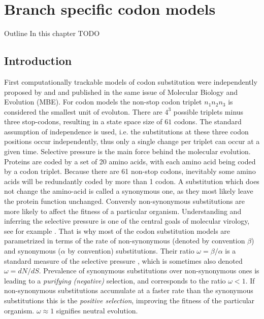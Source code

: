 \chapter{Branch specific codon models\label{chap:dpp}}

\begin{remark}{Outline}
In this chapter
TODO
\end{remark}

\section{Introduction}

First computationally trackable models of codon substitution were independently proposed by \cite{Muse1994} and \cite{Goldman1994} and published in the same issue of Molecular Biology and Evolution (MBE).
For codon models the non-stop codon triplet $n_{1}n_{2}n_{3}$ is considered the smallest unit of evoluton.
There are $4^3$ possible triplets minus three stop-codons, resulting in a state space size of $61$ codons.
The standard assumption of independence is used, i.e. the substitutions at these three codon positions occur independently, thus only a single change per triplet can occur at a given time.
Selective pressure is the main force behind the molecular evolution.
Proteins are coded by a set of 20 amino acids, with each amino acid being coded by a codon triplet. 
Because there are 61 non-stop codons, inevitably some amino acids will be redundantly coded by more than 1 codon.
A substitution which does not change the amino-acid is called a synonymous 
one,
as they most likely leave the protein function unchanged.
Conversly non-synonymous substitutions are more likely to affect the fitness of a particular organism.
Understanding and inferring the selective pressure is one of the central goals of molecular virology, see for example \citet{Bielejec2014a}.
That is why most of the codon substitution models are parametrized in terms of the rate of non-synonymous (denoted by convention $\beta$) and synonymous ($\alpha$ by convention) substitutions.
Their ratio $\omega=\beta / \alpha$ is a standard measure of the selective pressure \citep{ThePhylogeneticHandbook}, which is sometimes also denoted $\omega = dN/dS$.
Prevalence of synonymous substitutions over non-synonymous ones is leading to a \emph{purifying (negative)} selection, and corresponds to the ratio $\omega <1$.
If non-synonymous substitutions accumulate at a faster rate than the synonymous substitutions this is the \emph{positive selection}, improving the fitness of the particular organism.
$\omega\approx 1$ signifies neutral evolution.

